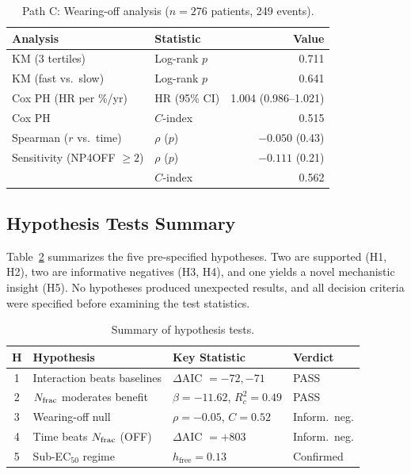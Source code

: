 \begin{table}[t]
\centering
\caption{Path C: Wearing-off analysis ($n{=}276$ patients, 249 events).}
\label{tab:path_c}
\begin{tabular}{@{}llr@{}}
\toprule
Analysis & Statistic & Value \\
\midrule
KM (3 tertiles)           & Log-rank $p$ & 0.711 \\
KM (fast vs.\ slow)       & Log-rank $p$ & 0.641 \\
Cox PH (HR per \%/yr)     & HR (95\% CI) & 1.004 (0.986--1.021) \\
Cox PH                    & $C$-index & 0.515 \\
Spearman ($r$ vs.\ time)  & $\rho$ ($p$) & $-0.050$ (0.43) \\
\midrule
Sensitivity (NP4OFF $\geq 2$) & $\rho$ ($p$) & $-0.111$ (0.21) \\
                               & $C$-index & 0.562 \\
\bottomrule
\end{tabular}
\end{table}


\subsection{Hypothesis Tests Summary}

Table~\ref{tab:hypotheses} summarizes the five pre-specified hypotheses.
Two are supported (H1, H2), two are informative negatives (H3, H4), and
one yields a novel mechanistic insight (H5). No hypotheses produced
unexpected results, and all decision criteria were specified before
examining the test statistics.

\begin{table}[t]
\centering
\caption{Summary of hypothesis tests.}
\label{tab:hypotheses}
\begin{tabular}{@{}clll@{}}
\toprule
H & Hypothesis & Key Statistic & Verdict \\
\midrule
1 & Interaction beats baselines & $\Delta$AIC $= -72, -71$ & PASS \\
2 & $N_{\mathrm{frac}}$ moderates benefit & $\beta = -11.62$, $R^2_c = 0.49$ & PASS \\
3 & Wearing-off null & $\rho = -0.05$, $C = 0.52$ & Inform.\ neg. \\
4 & Time beats $N_{\mathrm{frac}}$ (OFF) & $\Delta$AIC $= +803$ & Inform.\ neg. \\
5 & Sub-EC$_{50}$ regime & $h_\text{free} = 0.13$ & Confirmed \\
\bottomrule
\end{tabular}
\end{table}


